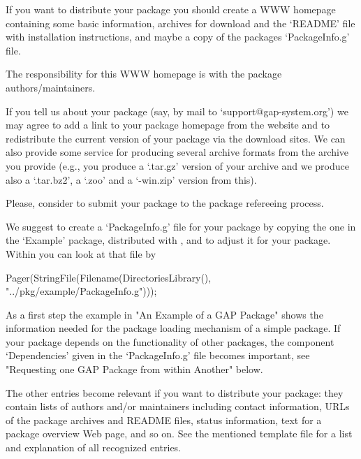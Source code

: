 
If  you want  to  distribute  your package  you  should  create a  WWW
homepage containing some basic  information, archives for download and
the `README' file with installation  instructions, and maybe a copy of
the packages `PackageInfo.g' file.

The  responsibility  for  this  WWW   homepage  is  with  the  package
authors/maintainers.

If   you   tell   us   about   your   package   (say,   by   mail   to
`support@gap-system.org') we  may agree  to add a  link to  your package
homepage  from the  {\GAP}  website and  to  redistribute the  current
version of  your package via  the {\GAP}  download sites. We  can also
provide some  service for producing  several archive formats  from the
archive you  provide (e.g.,  you produce a  `.tar.gz' version  of your
archive and  we produce also a  `.tar.bz2', a `.zoo' and  a `-win.zip'
version from  this). 

Please,  consider  to  submit  your  package  to  the  {\GAP}  package
refereeing process.


We  suggest to  create  a  `PackageInfo.g' file  for  your package  by
copying the one in the `Example' package, distributed with {\GAP}, and
to adjust it for your package. Within {\GAP} you can look at that file
by

\begintt
Pager(StringFile(Filename(DirectoriesLibrary(), 
                          "../pkg/example/PackageInfo.g")));
\endtt

As a first step the example in "An Example of a GAP Package" shows the
information  needed for  the  package loading  mechanism  of a  simple
package.  If  your  package  depends on  the  functionality  of  other
packages, the  component `Dependencies'  given in  the `PackageInfo.g'
file becomes  important, see "Requesting  one GAP Package  from within
Another" below.

The  other entries  become relevant  if  you want  to distribute  your
package: they  contain lists  of authors and/or  maintainers including
contact information,  URLs of the  package archives and  README files,
status information, text  for a package overview Web page,  and so on.
See the  mentioned template  file for  a list  and explanation  of all
recognized entries.

